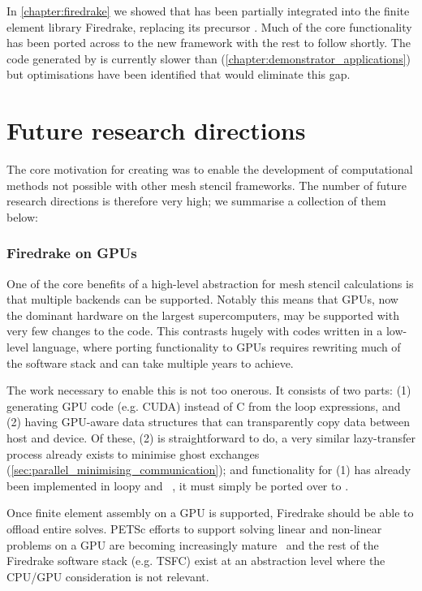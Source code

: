 \documentclass[thesis]{subfiles}
\begin{document}
In \cref{chapter:firedrake} we showed that  has been partially integrated into the finite element library Firedrake, replacing its precursor .
Much of the core functionality has been ported across to the new framework with the rest to follow shortly.
The code generated by  is currently slower than  (\cref{chapter:demonstrator_applications}) but optimisations have been identified that would eliminate this gap.

\section{Future research directions}
\label{sec:future_work}

The core motivation for creating  was to enable the development of computational methods not possible with other mesh stencil frameworks.
The number of future research directions is therefore very high; we summarise a collection of them below:

\subsubsection{Firedrake on GPUs}

One of the core benefits of a high-level abstraction for mesh stencil calculations is that multiple backends can be supported.
Notably this means that GPUs, now the dominant hardware on the largest supercomputers, may be supported with very few changes to the code.
This contrasts hugely with codes written in a low-level language, where porting functionality to GPUs requires rewriting much of the software stack and can take multiple years to achieve.

The work necessary to enable this is not too onerous.
It consists of two parts:
(1) generating GPU code (e.g. CUDA) instead of C from the loop expressions, and
(2) having GPU-aware data structures that can transparently copy data between host and device.
Of these, (2) is straightforward to do, a very similar lazy-transfer process already exists to minimise ghost exchanges (\cref{sec:parallel_minimising_communication}); and functionality for (1) has already been implemented in loopy and ~\cite{fenics2021-kulkarni}, it must simply be ported over to .

Once finite element assembly on a GPU is supported, Firedrake should be able to offload entire solves.
PETSc efforts to support solving linear and non-linear problems on a GPU are becoming increasingly mature~\cite{millsPerformancePortablePETScGPUbased2020,millsPETScTAODevelopments2024}
and the rest of the Firedrake software stack (e.g. TSFC) exist at an abstraction level where the CPU/GPU consideration is not relevant.
\end{document}
